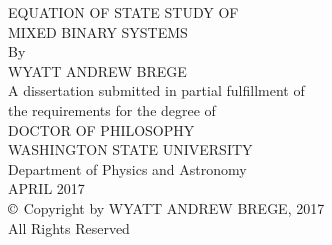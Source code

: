 \label{chap:title}

\begin{titlepage}
  \begin{singlespace}
    \begin{center}
      {\uppercase{
          Equation of State Study of\\
          \bigskip
          Mixed Binary Systems}}\\
      \vspace{1.31in}
      By\\
      \bigskip
      \uppercase{Wyatt Andrew Brege}\\
      \vspace{2.65in}
      A dissertation submitted in partial fulfillment of\\
      the requirements for the degree of\\
      \bigskip
      \uppercase{Doctor of Philosophy}\\
      \bigskip \bigskip \bigskip
      \uppercase{Washington State University}\\
      Department of Physics and Astronomy\\
      \bigskip
      \uppercase{April 2017}\\
      \bigskip \bigskip
      $\copyright$ Copyright by WYATT ANDREW BREGE, 2017\\
      All Rights Reserved
    \end{center}
  \end{singlespace}
\end{titlepage}
\newpage
